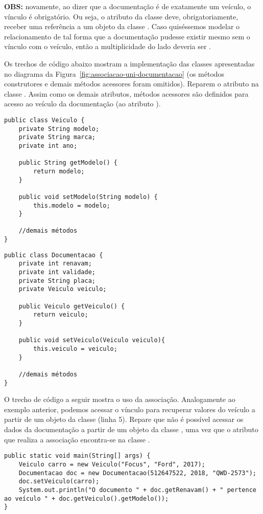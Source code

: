 \textbf{OBS:} novamente, ao dizer que a documentação é de exatamente um veículo, o vínculo é obrigatório. Ou seja, o atributo  da classe  deve, obrigatoriamente, receber uma referência a um objeto da classe . Caso quiséssemos modelar o relacionamento de tal forma que a documentação pudesse existir mesmo sem o vínculo com o veículo, então a multiplicidade do lado  deveria ser .

Os trechos de código abaixo mostram a implementação das classes apresentadas no diagrama da Figura~\ref{fig:associacao-uni-documentacao} (os métodos construtores e demais métodos acessores foram omitidos). Reparem o atributo  na classe . Assim como os demais atributos, métodos acessores são definidos para acesso ao veículo da documentação (ao atributo ).

\begin{verbatim}
public class Veiculo {
	private String modelo;
	private String marca;
	private int ano;
	
	public String getModelo() {
		return modelo;
	}
	
	public void setModelo(String modelo) {
		this.modelo = modelo;
	}
	
	//demais métodos
}
\end{verbatim}

\begin{verbatim}
public class Documentacao {
	private int renavam;
	private int validade;
	private String placa;
	private Veiculo veiculo;
	
	public Veiculo getVeiculo() {
		return veiculo;
	}
	
	public void setVeiculo(Veiculo veiculo){
		this.veiculo = veiculo;
	}
	
	//demais métodos
}
\end{verbatim}

O trecho de código a seguir mostra o uso da associação. Analogamente ao exemplo anterior, podemos acessar o vínculo para recuperar valores do veículo a partir de um objeto da classe  (linha 5). Repare que não é possível acessar os dados da documentação a partir de um objeto da classe , uma vez que o atributo que realiza a associação encontra-se na classe .

\begin{verbatim}
public static void main(String[] args) {
	Veiculo carro = new Veiculo("Focus", "Ford", 2017);
	Documentacao doc = new Documentacao(512647522, 2018, "QWD-2573");
	doc.setVeiculo(carro);
	System.out.println("O documento " + doc.getRenavam() + " pertence ao veículo " + doc.getVeiculo().getModelo());
}
\end{verbatim}

